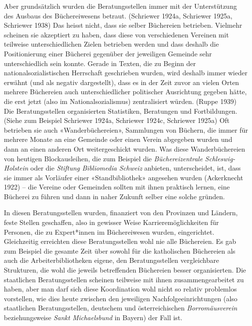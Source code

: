 \documentclass[a4paper,
fontsize=11pt,
oneside,
numbers=noperiodatend,
parskip=half-,
bibliography=totoc,
final
]{scrartcl}
\begin{document}
Aber grundsätzlich wurden die Beratungsstellen immer mit der
Unterstützung des Ausbaus des Büchereiwesens betraut. (Schriewer 1924a,
Schriewer 1925a, Schriewer 1938) Das heisst nicht, dass sie selber
Büchereien betrieben. Vielmehr scheinen sie akzeptiert zu haben, dass
diese von verschiedenen Vereinen mit teilweise unterschiedlichen Zielen
betrieben werden und dass deshalb die Positionierung einer Bücherei
gegenüber der jeweiligen Gemeinde sehr unterschiedlich sein konnte.
Gerade in Texten, die zu Beginn der nationalsozialistischen Herrschaft
geschrieben wurden, wird deshalb immer wieder erwähnt (und als negativ
dargestellt), dass es in der Zeit zuvor an vielen Orten mehrere
Büchereien auch unterschiedlicher politischer Ausrichtung gegeben hätte,
die erst jetzt (also im Nationalsozialismus) zentralisiert würden.
(Ruppe 1939) Die Beratungsstellen organisierten Statistiken, Beratungen
und Fortbildungen. (Siehe zum Beispiel Schriewer 1924a, Schriewer 1924c,
Schriewer 1925a) Oft betrieben sie auch «Wanderbüchereien», Sammlungen
von Büchern, die immer für mehrere Monate an eine Gemeinde oder einen
Verein abgegeben wurden und dann an einen anderen Ort weitergeschickt
wurden. Was diese Wanderbüchereien von heutigen Blockausleihen, die zum
Beispiel die \emph{Büchereizentrale Schleswig-Holstein} oder die
\emph{Stiftung Bibliomedia Schweiz} anbieten, unterscheidet, ist, dass
sie immer als Vorläufer einer «Standbibliothek» angesehen wurden
(Ackerknecht 1922) -- die Vereine oder Gemeinden sollten mit ihnen
praktisch lernen, eine Bücherei zu führen und dann in naher Zukunft
selber eine solche gründen.

In diesen Beratungsstellen wurden, finanziert von den Provinzen und
Ländern, feste Stellen geschaffen, also in gewisser Weise
Karrieremöglichkeiten für Personen, die zu Expert*innen im Büchereiwesen
wurden, eingerichtet. Gleichzeitig erreichten diese Beratungsstellen
wohl nie alle Büchereien. Es gab zum Beispiel die gesamte Zeit über
sowohl für die katholischen Büchereien als auch die Arbeiterbibliotheken
eigene, den Beratungsstellen vergleichbare Strukturen, die wohl die
jeweils betreffenden Büchereien besser organisierten. Die staatlichen
Beratungsstellen scheinen teilweise mit ihnen zusammengearbeitet zu
haben, aber man darf sich diese Koordination wohl nicht so relativ
problemlos vorstellen, wie dies heute zwischen den jeweiligen
Nachfolgeeinrichtungen (also staatlichen Beratungsstellen, deutschem und
österreichischen \emph{Borromäusverein} beziehungsweise \emph{Sankt
Michaelsbund} in Bayern) der Fall ist.
\end{document}
